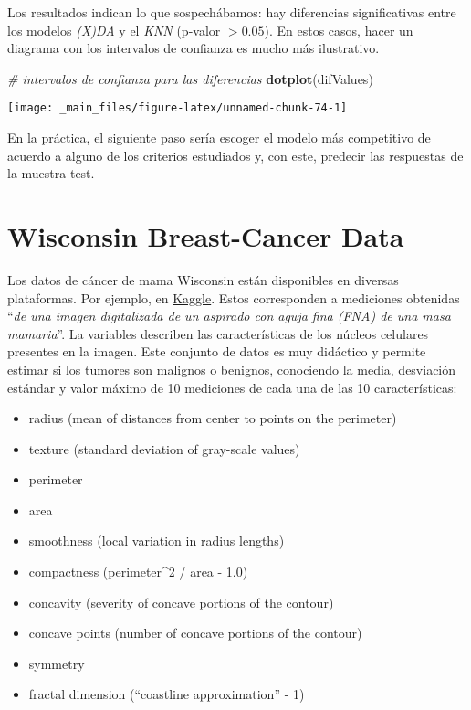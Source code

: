 \documentclass[]{book}
\newenvironment{Shaded}{\begin{snugshade}}{\end{snugshade}}
\newcommand{\CommentTok}[1]{\textcolor[rgb]{0.56,0.35,0.01}{\textit{#1}}}
\newcommand{\KeywordTok}[1]{\textcolor[rgb]{0.13,0.29,0.53}{\textbf{#1}}}
\newcommand{\NormalTok}[1]{#1}
\providecommand{\tightlist}{%
  \setlength{\itemsep}{0pt}\setlength{\parskip}{0pt}}
\begin{document}
Los resultados indican lo que sospechábamos: hay diferencias significativas entre los modelos \emph{(X)DA} y el \emph{KNN} (p-valor \(> 0.05\)). En estos casos, hacer un diagrama con los intervalos de confianza es mucho más ilustrativo.

\begin{Shaded}
\begin{Highlighting}[]
\CommentTok{# intervalos de confianza para las diferencias}
\KeywordTok{dotplot}\NormalTok{(difValues)}
\end{Highlighting}
\end{Shaded}

\begin{center}\texttt{[image: \_main\_files/figure-latex/unnamed-chunk-74-1]} \end{center}

En la práctica, el siguiente paso sería escoger el modelo más competitivo de acuerdo a alguno de los criterios estudiados y, con este, predecir las respuestas de la muestra test.

\hypertarget{wiscon}{%
\chapter{Wisconsin Breast-Cancer Data}\label{wiscon}}

Los datos de cáncer de mama Wisconsin están disponibles en diversas plataformas. Por ejemplo, en \href{https://www.kaggle.com/uciml/breast-cancer-wisconsin-data}{Kaggle}. Estos corresponden a mediciones obtenidas ``\emph{de una imagen digitalizada de un aspirado con aguja fina (FNA) de una masa mamaria}''. La variables describen las características de los núcleos celulares presentes en la imagen. Este conjunto de datos es muy didáctico y permite estimar si los tumores son malignos o benignos, conociendo la media, desviación estándar y valor máximo de 10 mediciones de cada una de las 10 características:

\begin{itemize}
\tightlist
\item
  radius (mean of distances from center to points on the perimeter)
\item
  texture (standard deviation of gray-scale values)
\item
  perimeter
\item
  area
\item
  smoothness (local variation in radius lengths)
\item
  compactness (perimeter\^{}2 / area - 1.0)
\item
  concavity (severity of concave portions of the contour)
\item
  concave points (number of concave portions of the contour)
\item
  symmetry
\item
  fractal dimension (``coastline approximation'' - 1)
\end{itemize}
\end{document}
